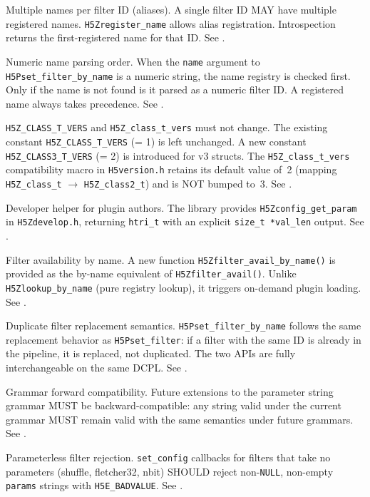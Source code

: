 \documentclass[../HDF5_RFC.tex]{subfiles}
\begin{document}
Multiple names per filter ID (aliases). A single filter ID MAY have
multiple registered names. \texttt{H5Zregister\_name} allows alias registration.
Introspection returns the first-registered name for that ID. See
.

Numeric name parsing order. When the \texttt{name} argument to
\texttt{H5Pset\_filter\_by\_name} is a numeric string, the name registry is checked
first. Only if the name is not found is it parsed as a numeric filter ID. A
registered name always takes precedence. See .

\texttt{H5Z\_CLASS\_T\_VERS} and \texttt{H5Z\_class\_t\_vers} must not change. The
existing constant \texttt{H5Z\_CLASS\_T\_VERS} (= 1) is left unchanged. A new constant
\texttt{H5Z\_CLASS3\_T\_VERS} (= 2) is introduced for v3 structs. The
\texttt{H5Z\_class\_t\_vers} compatibility macro in \texttt{H5version.h} retains its default
value of~2 (mapping \texttt{H5Z\_class\_t} $\rightarrow$ \texttt{H5Z\_class2\_t}) and is NOT
bumped to~3. See .

Developer helper for plugin authors. The library provides
\texttt{H5Zconfig\_get\_param} in \texttt{H5Zdevelop.h}, returning \texttt{htri\_t} with an
explicit \texttt{size\_t *val\_len} output. See .

Filter availability by name. A new function
\texttt{H5Zfilter\_avail\_by\_name()} is provided as the by-name equivalent of
\texttt{H5Zfilter\_avail()}. Unlike \texttt{H5Zlookup\_by\_name} (pure registry lookup), it
triggers on-demand plugin loading. See .

Duplicate filter replacement semantics. \texttt{H5Pset\_filter\_by\_name}
follows the same replacement behavior as \texttt{H5Pset\_filter}: if a filter with
the same ID is already in the pipeline, it is replaced, not duplicated. The
two APIs are fully interchangeable on the same DCPL. See
.

Grammar forward compatibility. Future extensions to the parameter
string grammar MUST be backward-compatible: any string valid under the current
grammar MUST remain valid with the same semantics under future grammars. See
.

Parameterless filter rejection. \texttt{set\_config} callbacks for filters
that take no parameters (shuffle, fletcher32, nbit) SHOULD reject
non-\texttt{NULL}, non-empty \texttt{params} strings with \texttt{H5E\_BADVALUE}. See
.
\end{document}

